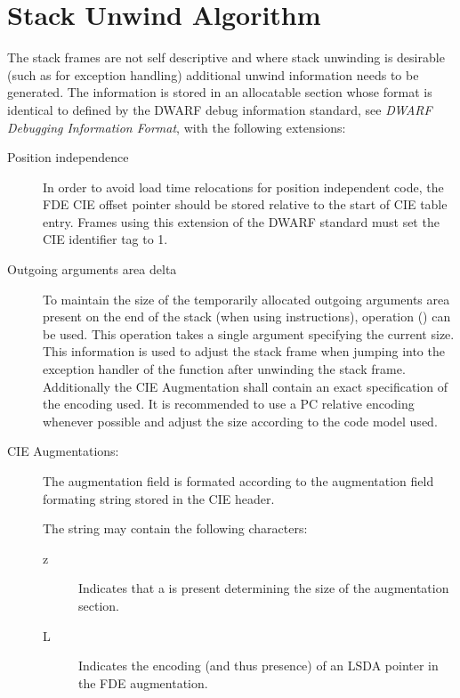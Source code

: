 \section{Stack Unwind Algorithm}

The stack frames are not self descriptive and where stack unwinding is
desirable (such as for exception handling) additional unwind
information needs to be generated.  The information is stored in an
allocatable section  whose format is identical to
 defined by the DWARF debug information standard,
see \emph{DWARF Debugging Information Format}, with the following
extensions:

\begin{description}
\item[Position independence]

  In order to avoid load time relocations for position independent
  code, the FDE CIE offset pointer should be stored relative to the
  start of CIE table entry.  Frames using this extension of the DWARF
  standard must set the CIE identifier tag to 1.

\item[Outgoing arguments area delta]
  
  To maintain the size of the temporarily allocated outgoing arguments
  area present on the end of the stack (when using 
  instructions), operation  () can be
  used.  This operation takes a single  argument
  specifying the current size.  This information is used to adjust the
  stack frame when jumping into the exception handler of the function
  after unwinding the stack frame.  Additionally the CIE Augmentation
  shall contain an exact specification of the encoding used.  It is
  recommended to use a PC relative encoding whenever possible and
  adjust the size according to the code model used.

\item[CIE Augmentations:]
 
  The augmentation field is formated according to the augmentation
  field formating string stored in the CIE header.
  
  The string may contain the following characters:

\begin{description}
\item[z] Indicates that a  is present determining the size of
  the augmentation section.
\item[L] Indicates the encoding (and thus presence) of an LSDA pointer in the FDE augmentation.
  

\end{description}
\end{description}
